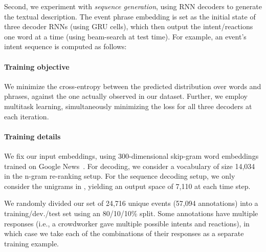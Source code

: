 \documentclass[11pt,a4paper]{article}
\begin{document}
\noindent Second, we experiment with \textit{sequence generation}, using RNN decoders to generate the textual description.
The event phrase embedding  is set as the initial state  of three decoder RNNs (using GRU cells), which then output the intent/reactions one word at a time (using beam-search at test time).
For example, an event's intent sequence  is computed as follows: 



\paragraph{Training objective}
We minimize the cross-entropy between the predicted distribution over words and phrases, against the one actually observed in our dataset. 
Further, we employ multitask learning, simultaneously minimizing the loss for all three decoders at each iteration.

\paragraph{Training details}
We fix our input embeddings, using 300-dimensional skip-gram 
word embeddings trained on Google News~\cite{Mikolov2013EfficientEO}. 
For decoding, we consider a vocabulary of size  14,034 in the n-gram re-ranking setup.
For the sequence decoding setup, we only consider the unigrams in , yielding an output space of 7,110 at each time step.




We randomly divided our set of 24,716 unique events (57,094 annotations) into a training/dev./test set using an 80/10/10\% split.  Some annotations have multiple responses (i.e., a crowdworker gave multiple possible intents and reactions), in which case we take each of the combinations of their responses as a separate training example. 
\end{document}
